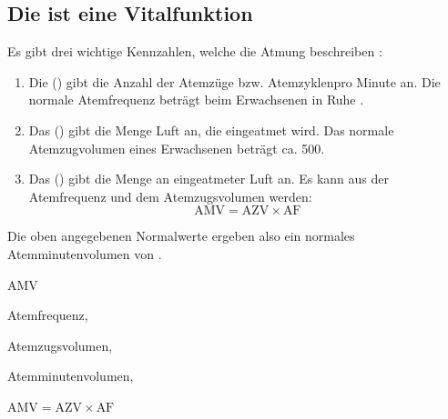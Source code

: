 \subsection{Die  ist eine Vitalfunktion}
\label{topic:vitalfunktion-atmung}%
%

{%
\label{topic:atemvolumina}
%
Es gibt drei wichtige Kennzahlen, welche die Atmung beschreiben
\cite{KlinkePhysio3,SchmidtPhysio28,DRAn3,StriebelAn7}:
\begin{enumerate}
  \item Die  () gibt die Anzahl der Atemzüge 
  bzw. Atemzyklenpro Minute an. 
  Die normale Atemfrequenz beträgt beim Erwachsenen in Ruhe 
  \PerMin*.
  \item Das  () gibt die Menge Luft an, 
  die  eingeatmet wird. 
  Das normale Atemzugvolumen eines Erwachsenen beträgt 
  ca. 500\Ml*. 
  \item Das  () gibt die Menge
  an  eingeatmeter Luft an. 
  Es kann aus der
  Atemfrequenz und dem Atemzugsvolumen  werden:
  {\FontSansNarrowFamily
  \begin{equation}
    \mbox{AMV} = \mbox{AZV} \times \mbox{AF}
  \end{equation}}
\end{enumerate}
Die oben angegebenen Normalwerte ergeben also ein normales
  Atemminutenvolumen von  \LPerMin*. 

}{
\begin{labeling}[:]{AMV}
    \item[AF] Atemfrequenz,
    \item[AZV] Atemzugsvolumen,
    \EE{500\Ml*}
    \item[AMV] Atemminutenvolumen,
\end{labeling}

\begin{center}
{\FontSansNarrowFamily
$\mbox{AMV} = \mbox{AZV} \times \mbox{AF}$
}
\end{center}
}{}{}{}

